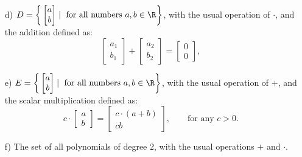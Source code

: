 \begin{problem}[3 points]
\begin{enumerate}
        \item [d)] $D =  \bigg\{ \begin{bmatrix} a \\ b \end{bmatrix} \mid \text{ for all numbers }a,b\in\R\bigg\}$, with the usual operation of $\cdot$, and the addition defined as:
        \[ \begin{bmatrix} a_1 \\ b_1 \end{bmatrix} +\begin{bmatrix} a_2 \\ b_2 \end{bmatrix} = \begin{bmatrix} 0 \\ 0\end{bmatrix}  ,\]
        
        \item [e)] $E =  \bigg\{ \begin{bmatrix} a \\ b \end{bmatrix} \mid \text{ for all numbers }a,b\in\R\bigg\}$, with the usual operation of $+$, and the scalar multiplication defined as:
        \[ c \cdot \begin{bmatrix} a \\ b \end{bmatrix} = \begin{bmatrix} c \cdot ( a+b) \\ cb\end{bmatrix}  , \qquad \text{for any } c>0.\]

        \item [f)] The set of all polynomials of degree $2$, with the usual operations $+$ and $\cdot$.

        
    \end{enumerate}
\end{problem}

